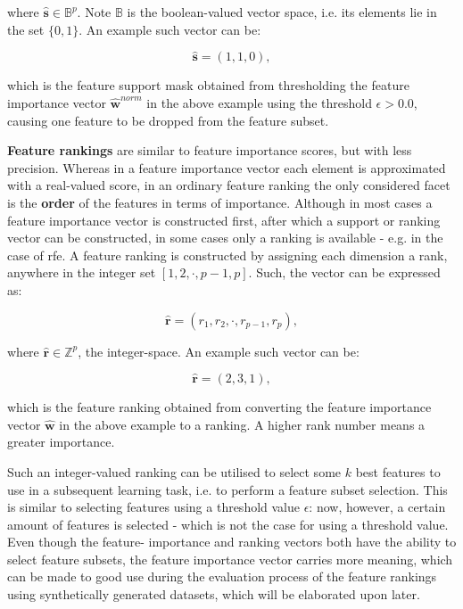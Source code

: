 \documentclass{article}
\begin{document}
where $\hat{\boldsymbol{s}} \in \mathbb{B}^p$. Note $\mathbb{B}$ is the boolean-valued vector space, i.e. its elements lie in the set $\{0, 1\}$. An example such vector can be:

$$\hat{\boldsymbol{s}} = (1, 1, 0),$$

which is the feature support mask obtained from thresholding the feature importance vector $\hat{\boldsymbol{w}}^{norm}$ in the above example using the threshold $\epsilon > 0.0$, causing one feature to be dropped from the feature subset.

\textbf{Feature rankings} are similar to feature importance scores, but with less precision. Whereas in a feature importance vector each element is approximated with a real-valued score, in an ordinary feature ranking the only considered facet is the \textbf{order} of the features in terms of importance. Although in most cases a feature importance vector is constructed first, after which a support or ranking vector can be constructed, in some cases only a ranking is available - e.g. in the case of \gls{rfe}. A feature ranking is constructed by assigning each dimension a rank, anywhere in the integer set $[1, 2, \cdot, p - 1, p]$. Such, the vector can be expressed as:

\begin{equation}
\hat{\boldsymbol{r}} = (r_1, r_2, \cdot, r_{p-1}, r_p),
\end{equation}

where $\hat{\boldsymbol{r}} \in \mathbb{Z}^p$, the integer-space. An example such vector can be:

$$\hat{\boldsymbol{r}} = (2, 3, 1),$$

which is the feature ranking obtained from converting the feature importance vector $\hat{\boldsymbol{w}}$ in the above example to a ranking. A higher rank number means a greater importance.

Such an integer-valued ranking can be utilised to select some $k$ best features to use in a subsequent learning task, i.e. to perform a feature subset selection. This is similar to selecting features using a threshold value $\epsilon$: now, however, a certain amount of features is selected - which is not the case for using a threshold value. Even though the feature- importance and ranking vectors both have the ability to select feature subsets, the feature importance vector carries more meaning, which can be made to good use during the evaluation process of the feature rankings using synthetically generated datasets, which will be elaborated upon later.
\end{document}
